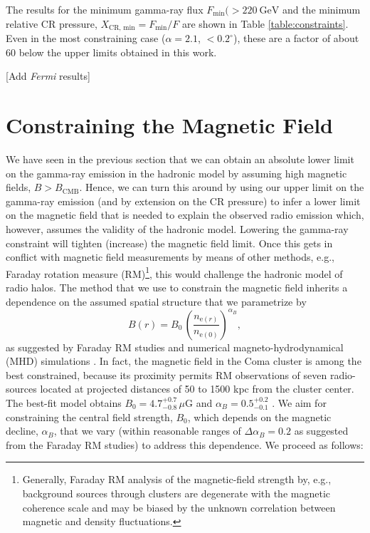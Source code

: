 \documentclass[12pt,manuscript]{aastex}
\newcommand{\rmn}{\mathrm}
\newcommand{\CR}{\mathrm{CR}}
\begin{document}
The results for the minimum gamma-ray flux $F_{\rmn{min}}(>220~\rmn{GeV}$ and the minimum relative CR pressure, $X_{\CR,\,\rmn{min}} = F_{\rmn{min}}/F$ are shown in Table \ref{table:constraints}. Even in the most constraining case ($\alpha=2.1$, $<0.2^{\circ}$), these are a factor of about 60 below the upper limits obtained in this work. 

[Add {\em Fermi} results]

\section{Constraining the Magnetic Field}
\label{sec:B}
We have seen in the previous section that we can obtain an absolute lower limit on the gamma-ray emission in the hadronic model by assuming high magnetic fields, $B>B_\rmn{CMB}$. Hence, we can turn this around by using our upper limit on the gamma-ray emission (and by extension on the CR pressure) to infer a lower limit on the magnetic field that is needed to explain the observed radio emission which, however, assumes the validity of the hadronic model. Lowering the gamma-ray constraint will tighten (increase) the magnetic field limit. Once this gets in conflict with magnetic field measurements by means of other methods, e.g., Faraday rotation measure (RM)\footnote{Generally, Faraday RM analysis of the magnetic-field strength by, e.g., background sources through clusters are degenerate with the magnetic coherence scale and may be biased by the unknown correlation between magnetic and density fluctuations.}, this would challenge the hadronic model of radio halos. The method that we use to constrain the magnetic field inherits a dependence on the assumed spatial structure that we parametrize by
\begin{equation}
\label{eq:B}
B(r) = B_{0} \,\left(\frac{n_{\rmn{e}(r)}}{n_{\rmn{e}(0)}}\right)^{\alpha_B},
\end{equation}
as suggested by Faraday RM studies and numerical magneto-hydrodynamical (MHD) simulations \citep[][and references therein]{article:Bonafede_etal:2010, article:Bonafede_etal:2011}. In fact, the magnetic field in the Coma cluster is among the best constrained, because its proximity permits RM observations of
seven radio-sources located at projected distances of 50 to 1500 kpc from the cluster center. The best-fit model obtains $B_{0} = 4.7^{+0.7}_{-0.8}\,\mu$G and $\alpha_{B} = 0.5^{+0.2}_{-0.1}$ \citep{article:Bonafede_etal:2010}. We aim for constraining the central field strength, $B_{0}$, which depends on the magnetic decline, $\alpha_{B}$, that we vary (within reasonable ranges of $\Delta\alpha_{B}=0.2$ as suggested from the Faraday RM studies) to address this dependence. We proceed as follows:
\end{document}

